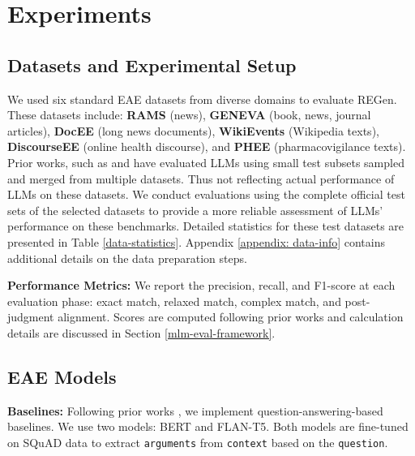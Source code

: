 \section{Experiments}
\subsection{Datasets and Experimental Setup}
We used six standard EAE datasets from diverse domains to evaluate REGen. These datasets include: \textbf{RAMS} \cite{ebner-etal-2020-multi} (news), \textbf{GENEVA} \cite{parekh-etal-2023-geneva} (book, news, journal articles), \textbf{DocEE} \cite{tong-etal-2022-docee} (long news documents), \textbf{WikiEvents} \cite{li-etal-2021-document} (Wikipedia texts), \textbf{DiscourseEE} \cite{sharif-etal-2024-explicit} (online health discourse), and \textbf{PHEE} \cite{sun-etal-2022-phee} (pharmacovigilance texts). Prior works, such as \citet{huang-etal-2024-textee} and \citet{lu2024exactmatchsemanticallyreassessing} have evaluated LLMs using small test subsets sampled and merged from multiple datasets. Thus not reflecting actual performance of LLMs on these datasets. We conduct evaluations using the complete official test sets of the selected datasets to provide a more reliable assessment of LLMs' performance on these benchmarks. Detailed statistics for these test datasets are presented in Table \ref{data-statistics}. Appendix \ref{appendix: data-info} contains additional details on the data preparation steps.

\noindent
\textbf{Performance Metrics:} We report the precision, recall, and F1-score at each evaluation phase: exact match, relaxed match, complex match, and post-judgment alignment. Scores are computed following prior works \cite{peng-etal-2023-devil} and calculation details are discussed in Section \ref{mlm-eval-framework}.

\subsection{EAE Models}
\textbf{Baselines:} Following prior works \cite{sharif-etal-2024-explicit, lu-etal-2023-event}, we implement question-answering-based baselines. We use two models: BERT and FLAN-T5. Both models are fine-tuned on SQuAD \cite{rajpurkar-etal-2016-squad} data to extract \texttt{arguments} from \texttt{context} based on the \texttt{question}.  

